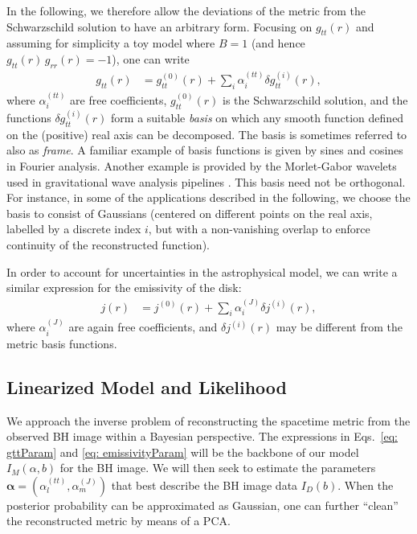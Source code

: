\documentclass[%
nofootinbib,
 amsmath,amssymb,
 aps,
floatfix,
twocolumn
]{revtex4-2}
\begin{document}
In the following, we therefore allow  the deviations of the metric 
from the Schwarzschild solution to have an arbitrary form. Focusing on  \(g_{tt}(r)\)
and assuming for simplicity a toy model where $B=1$ (and hence $g_{tt}(r)\, g_{rr}(r)=-1$), one can write
%
\begin{align}\label{eq: gttParam}
    g_{tt}(r) & = g_{tt}^{(0)}(r) + \sum_{i} \alpha^{(tt)}_{i} \delta g_{tt}^{(i)}(r), %
\end{align}
%
where $\alpha^{(tt)}_{i}$ are free coefficients,  \(g_{tt}^{(0)}(r)\) is the Schwarzschild solution, and the functions \(\delta g_{tt}^{(i)}(r)\) form a suitable \emph{basis} 
on which any smooth 
function defined   on the (positive) real axis can be decomposed. The basis is sometimes referred to also as \emph{frame}. A familiar example of basis functions is given by sines and cosines in Fourier analysis. Another example is provided by the Morlet-Gabor wavelets used in gravitational wave analysis pipelines \cite{Cornish_2021}.
%
This basis need not be orthogonal. For instance,
in some of the applications described in the following, we choose the basis to consist of Gaussians (centered on different points on the real axis, labelled by a discrete index \(i\), but with a non-vanishing overlap to enforce continuity of the reconstructed function).  
%

In order to account for uncertainties in the astrophysical model, we can write a similar expression for the emissivity of the disk:
%
\begin{align}\label{eq: emissivityParam}
        j(r) & = j^{(0)}(r) + \sum_{i} \alpha_{i}^{(J)} \delta j^{(i)} (r),
\end{align}
%
where $ \alpha_{i}^{(J)}$ are again free coefficients, and \(\delta j^{(i)} (r)\) may be different from the metric basis functions.

\subsection{Linearized Model and Likelihood}\label{method_linear_likelihood}

We approach the inverse problem of reconstructing the spacetime metric from the observed BH image within a Bayesian perspective. The expressions in Eqs.~\eqref{eq: gttParam} and \eqref{eq: emissivityParam} will be the backbone of our model \(I_M(\alpha, b)\) for the BH image. We will then seek to estimate the parameters \(\boldsymbol{\alpha} = \left(\alpha^{(tt)}_{l}, \alpha^{(J)}_{m}\right)\) that best describe the  BH image data \(I_D(b)\). When the posterior probability can be approximated as Gaussian, one can further ``clean'' the reconstructed metric by means of a PCA.
\end{document}
